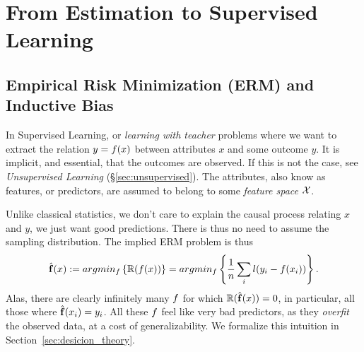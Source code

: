 \section{From Estimation to Supervised Learning}
\label{sec:learning}

\subsection{Empirical Risk Minimization (ERM) and Inductive Bias}
In Supervised Learning, or \emph{learning with teacher} problems where we want to extract the relation $y=f(x)$ between attributes $x$ and some outcome $y$.
It is implicit, and essential, that the outcomes are observed. If this is not the case, see \emph{Unsupervised Learning }(\S\ref{sec:unsupervised}).
The attributes, also know as features, or predictors, are assumed to belong to some \emph{feature space} $\mathcal{X}$. 

Unlike classical statistics, we don't care to explain the causal process relating $x$ and $y$, we just want good predictions.  There is thus no need to assume the sampling distribution. The implied ERM problem is thus
\begin{align}
	\hat{\mathbf{f}}(x) := argmin_{f}\left\{ \mathbb{R}(f(x)) \right\} = argmin_{f}\left\{ \frac{1}{n} \sum_i l(y_i - f(x_i)) \right\}.
\end{align}
Alas, there are clearly infinitely many $f$ for which $\mathbb{R}(\hat{\mathbf{f}}(x))=0$, in particular, all those where $\hat{\mathbf{f}}(x_i)=y_i$.
All these $f$ feel like very bad predictors, as they \emph{overfit} the observed data, at a cost of generalizability.
We formalize this intuition in Section~\ref{sec:desicion_theory}. 

